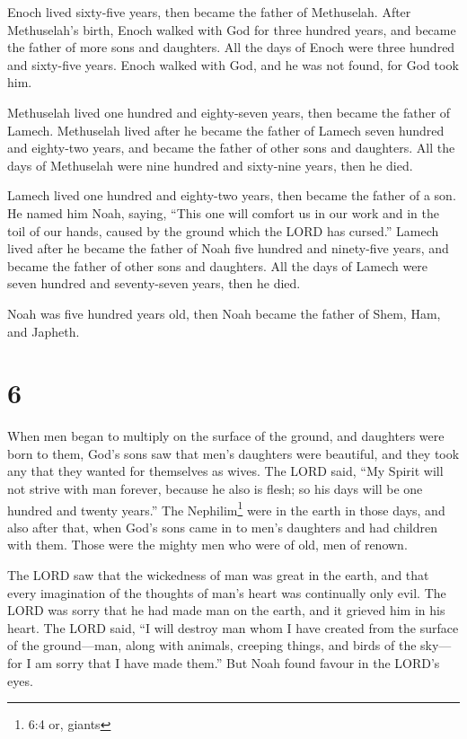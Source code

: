 Enoch lived sixty-five years, then became the father of
Methuselah.  After Methuselah's birth, Enoch walked with
God for three hundred years, and became the father of more sons and
daughters.  All the days of Enoch were three hundred and
sixty-five years.  Enoch walked with God, and he was not
found, for God took him.

 Methuselah lived one hundred and eighty-seven years, then
became the father of Lamech.  Methuselah lived after he
became the father of Lamech seven hundred and eighty-two years, and
became the father of other sons and daughters.  All the
days of Methuselah were nine hundred and sixty-nine years, then he died.

 Lamech lived one hundred and eighty-two years, then became
the father of a son.  He named him Noah, saying, ``This one
will comfort us in our work and in the toil of our hands, caused by the
ground which the LORD has cursed.''  Lamech lived after he
became the father of Noah five hundred and ninety-five years, and became
the father of other sons and daughters.  All the days of
Lamech were seven hundred and seventy-seven years, then he died.

 Noah was five hundred years old, then Noah became the
father of Shem, Ham, and Japheth.

\hypertarget{section-5}{%
\section{6}\label{section-5}}

 When men began to multiply on the surface of the ground,
and daughters were born to them,  God's sons saw that men's
daughters were beautiful, and they took any that they wanted for
themselves as wives.  The LORD said, ``My Spirit will not
strive with man forever, because he also is flesh; so his days will be
one hundred and twenty years.''  The Nephilim\footnote{6:4
  or, giants} were in the earth in those days, and also after that, when
God's sons came in to men's daughters and had children with them. Those
were the mighty men who were of old, men of renown.

 The LORD saw that the wickedness of man was great in the
earth, and that every imagination of the thoughts of man's heart was
continually only evil.  The LORD was sorry that he had made
man on the earth, and it grieved him in his heart.  The LORD
said, ``I will destroy man whom I have created from the surface of the
ground---man, along with animals, creeping things, and birds of the
sky---for I am sorry that I have made them.''  But Noah
found favour in the LORD's eyes.

